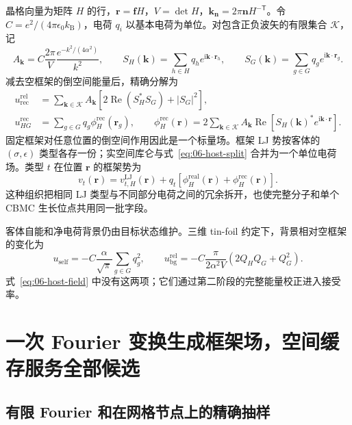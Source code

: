 晶格向量为矩阵 $H$ 的行，$\mathbf r=\mathbf fH$，$V=\det H$，$\mathbf k_{\mathbf n}=2\pi\mathbf nH^{-\mathsf T}$。令 $C=e^2/(4\pi\epsilon_0 k_{\mathrm B})$，电荷 $q_i$ 以基本电荷为单位。对包含正负波矢的有限集合 $\mathcal K$，记
\begin{equation}
A_{\mathbf k}=C\frac{2\pi}{V}\frac{e^{-k^2/(4\alpha^2)}}{k^2},\qquad
S_H(\mathbf k)=\sum_{h\in H}q_h e^{\mathrm i\mathbf k\cdot\mathbf r_h},\qquad
S_G(\mathbf k)=\sum_{g\in G}q_g e^{\mathrm i\mathbf k\cdot\mathbf r_g}.
\label{eq:06-structure}
\end{equation}
减去空框架的倒空间能量后，精确分解为
\begin{align}
u_{\mathrm{rec}}^{\mathrm{rel}}
&=\sum_{\mathbf k\in\mathcal K} A_{\mathbf k}
\left[2\operatorname{Re}(S_H^*S_G)+|S_G|^2\right],\nonumber\\
u_{HG}^{\mathrm{rec}}
&=\sum_{g\in G}q_g\phi_H^{\mathrm{rec}}(\mathbf r_g),\qquad
\phi_H^{\mathrm{rec}}(\mathbf r)
=2\sum_{\mathbf k\in\mathcal K}A_{\mathbf k}
\operatorname{Re}\!\left[S_H(\mathbf k)^*e^{\mathrm i\mathbf k\cdot\mathbf r}\right].
\label{eq:06-host-split}
\end{align}
固定框架对任意位置的倒空间作用因此是一个标量场。框架 LJ 势按客体的 $(\sigma,\epsilon)$ 类型各存一份；实空间库仑与式~\eqref{eq:06-host-split} 合并为一个单位电荷场。类型 $t$ 在位置 $\mathbf r$ 的框架势为
\begin{equation}
v_t(\mathbf r)
=v_{t,H}^{\mathrm{LJ}}(\mathbf r)
+q_t\left[\phi_H^{\mathrm{real}}(\mathbf r)+\phi_H^{\mathrm{rec}}(\mathbf r)\right].
\label{eq:06-host-field}
\end{equation}
这种组织把相同 LJ 类型与不同部分电荷之间的冗余拆开，也使完整分子和单个 CBMC 生长位点共用同一批字段。

客体自能和净电荷背景仍由目标状态维护。三维 tin-foil 约定下，背景相对空框架的变化为
\begin{equation}
u_{\mathrm{self}}=-C\frac{\alpha}{\sqrt\pi}\sum_{g\in G}q_g^2,\qquad
u_{\mathrm{bg}}^{\mathrm{rel}}
=-C\frac{\pi}{2\alpha^2V}\left(2Q_HQ_G+Q_G^2\right).
\label{eq:06-self-background}
\end{equation}
式~\eqref{eq:06-host-field} 中没有这两项；它们通过第二阶段的完整能量校正进入接受率。

\section{一次 Fourier 变换生成框架场，空间缓存服务全部候选}
\label{sec:06-grid}

\subsection{有限 Fourier 和在网格节点上的精确抽样}

